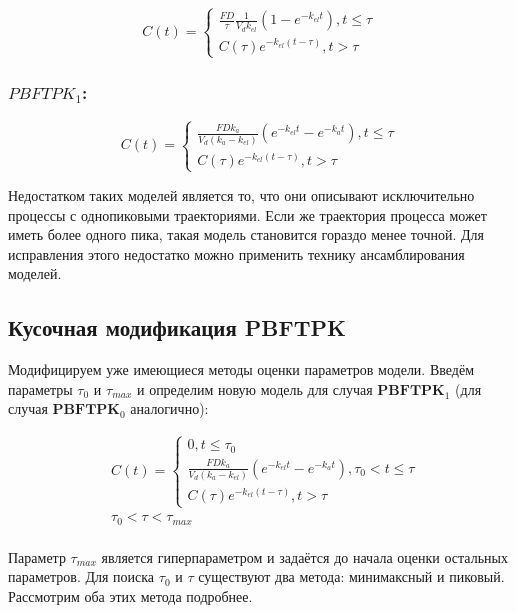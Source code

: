 \documentclass[12pt]{article}
\begin{document}
\[
	C(t) = \begin{cases}
		\frac{FD}{\tau} \frac{1}{V_d k_{el}} (1 - e^{-k_{el} t}), t \leq \tau \\
		C(\tau) e^{-k_{el}(t - \tau)}, t > \tau
	\end{cases}
\]

\subsubsection*{$PBFTPK_1$:}

\[
	C(t) = \begin{cases}
		\frac{FD k_a}{V_d (k_a - k_{el})} (e^{-k_{el}t} - e^{-k_a t}), t \leq \tau \\
		C(\tau) e^{-k_{el}(t - \tau)}, t > \tau
	\end{cases}
\]

Недостатком таких моделей является то, что они описывают исключительно процессы с однопиковыми траекториями. Если же траектория процесса может иметь более одного пика, такая модель становится гораздо менее точной. Для исправления этого недостатко можно применить технику ансамблирования моделей.

\subsection{Кусочная модификация PBFTPK}

Модифицируем уже имеющиеся методы оценки параметров модели. Введём параметры $\tau_0$ и $\tau_{max}$ и определим новую модель для случая $\textbf{PBFTPK}_1$ (для случая $\textbf{PBFTPK}_0$ аналогично):

\begin{align*}
	 & C(t) = \begin{cases}
		          0, t \leq \tau_0                                                                    \\
		          \frac{FD k_a}{V_d (k_a - k_{el})} (e^{-k_{el}t} - e^{-k_a t}), \tau_0 < t \leq \tau \\
		          C(\tau) e^{-k_{el}(t - \tau)}, t > \tau
	          \end{cases} \\
	 & \tau_0 < \tau < \tau_{max}                                                                                                                                        \\
\end{align*}

Параметр $\tau_{max}$ является гиперпараметром и задаётся до начала оценки остальных параметров. Для поиска $\tau_0$ и $\tau$ существуют два метода: минимаксный и пиковый. Рассмотрим оба этих метода подробнее.
\end{document}
